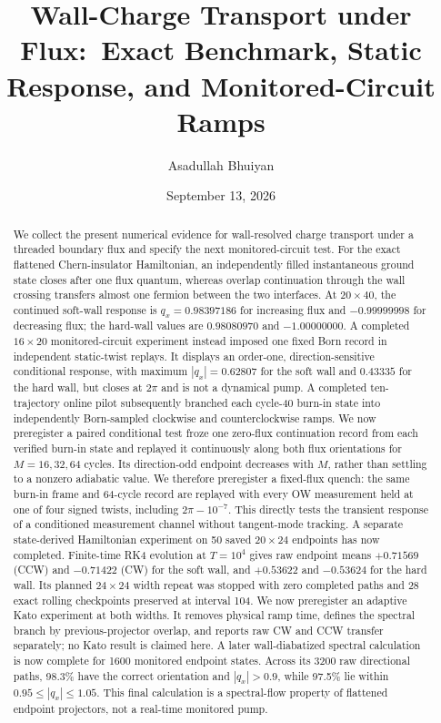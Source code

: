 \documentclass[aps,prb,twocolumn,floatfix,nofootinbib,superscriptaddress]{revtex4-2}
\begin{document}
\title{Wall-Charge Transport under Flux:\
Exact Benchmark, Static Response, and Monitored-Circuit Ramps}
\author{Asadullah Bhuiyan}
\date{September 13, 2026}

\begin{abstract}
We collect the present numerical evidence for wall-resolved charge transport
under a threaded boundary flux and specify the next monitored-circuit test.
For the exact flattened Chern-insulator Hamiltonian, an independently filled
instantaneous ground state closes after one flux quantum, whereas overlap
continuation through the wall crossing transfers almost one fermion between
the two interfaces.  At $20\times40$, the continued soft-wall response is
$q_x=0.98397186$ for increasing flux and $-0.99999998$ for decreasing flux;
the hard-wall values are $0.98080970$ and $-1.00000000$.  A completed
$16\times20$ monitored-circuit experiment instead imposed one fixed Born
record in independent static-twist replays.  It displays an order-one,
direction-sensitive conditional response, with maximum $|q_x|=0.62807$ for
the soft wall and $0.43335$ for the hard wall, but closes at $2\pi$ and is not
a dynamical pump.  A completed ten-trajectory online pilot subsequently
branched each cycle-40 burn-in state into independently Born-sampled
clockwise and counterclockwise ramps.  We now preregister a paired conditional
test froze one zero-flux continuation record from each verified burn-in state
and replayed it continuously along both flux orientations for $M=16,32,64$
cycles.  Its direction-odd endpoint decreases with $M$, rather than settling
to a nonzero adiabatic value.  We therefore preregister a fixed-flux quench:
the same burn-in frame and 64-cycle record are replayed with every OW
measurement held at one of four signed twists, including
$2\pi-10^{-7}$.  This directly tests the transient response of a conditioned
measurement channel without tangent-mode tracking.  A separate state-derived
Hamiltonian experiment on 50 saved $20\times24$ endpoints has now completed.
Finite-time RK4 evolution at $T=10^4$ gives raw endpoint means $+0.71569$
(CCW) and $-0.71422$ (CW) for the soft wall, and $+0.53622$ and $-0.53624$
for the hard wall.  Its planned $24\times24$ width repeat was stopped with
zero completed paths and 28 exact rolling checkpoints preserved at interval
104.  We now preregister an adaptive Kato experiment at both widths.  It
removes physical ramp time, defines the spectral branch by previous-projector
overlap, and reports raw CW and CCW transfer separately; no Kato result is
claimed here.  A later wall-diabatized spectral calculation is now complete
for 1600 monitored endpoint states.  Across its 3200 raw directional paths,
98.3\% have the correct orientation and $|q_x|>0.9$, while 97.5\% lie within
$0.95\leq|q_x|\leq1.05$.  This final calculation is a spectral-flow property
of flattened endpoint projectors, not a real-time monitored pump.
\end{abstract}
\end{document}
